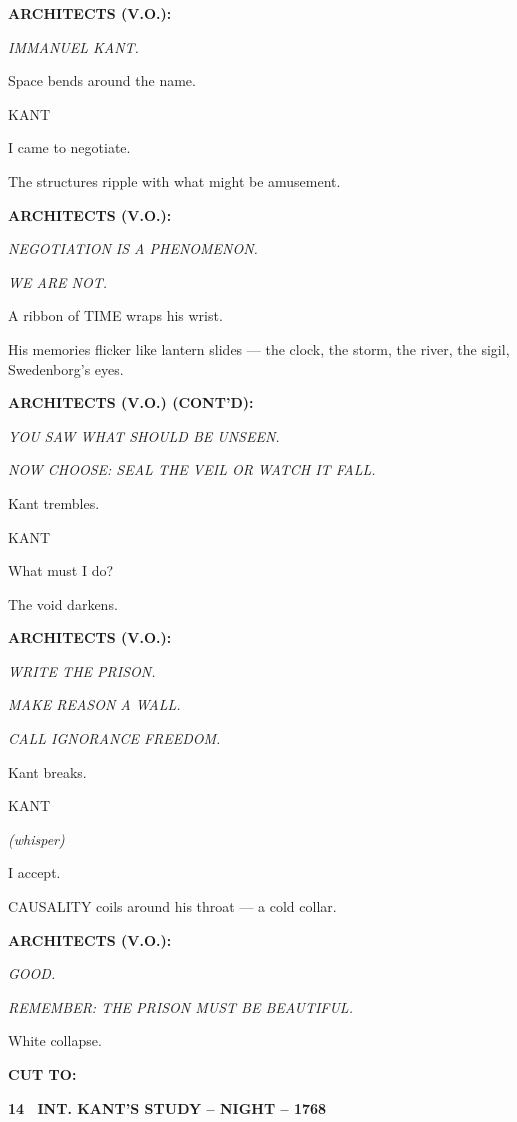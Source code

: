 \documentclass[12pt]{article}
\newcommand{\scene}[2]{%
  \vspace{1.8\baselineskip}%
  \noindent\textbf{#1 \ #2}\par\vspace{0.4\baselineskip}%
}
\newenvironment{dialogue}[1]{%
  \vspace{0.8\baselineskip}%
  \noindent\hspace*{2.3in}\textsc{#1}\par%
  \noindent\hspace*{1.5in}\begin{minipage}[t]{4.5in}%
}{%
  \end{minipage}\par%
}
\newcommand{\paren}[1]{%
  \noindent\hspace*{1.8in}\textit{(#1)}\par%
}
\newcommand{\transition}[1]{%
  \vspace{0.6\baselineskip}%
  \begin{flushright}\textbf{#1}\end{flushright}%
}
\begin{document}
\textbf{ARCHITECTS (V.O.):}

\emph{IMMANUEL KANT.}

Space bends around the name.

\begin{dialogue}{KANT}
I came to negotiate.
\end{dialogue}

The structures ripple with what might be amusement.

\textbf{ARCHITECTS (V.O.):}

\emph{NEGOTIATION IS A PHENOMENON.}

\emph{WE ARE NOT.}

A ribbon of TIME wraps his wrist.

His memories flicker like lantern slides --- the clock, the storm, the
river, the sigil, Swedenborg's eyes.

\textbf{ARCHITECTS (V.O.) (CONT'D):}

\emph{YOU SAW WHAT SHOULD BE UNSEEN.}

\emph{NOW CHOOSE: SEAL THE VEIL OR WATCH IT FALL.}

Kant trembles.

\begin{dialogue}{KANT}
What must I do?
\end{dialogue}

The void darkens.

\textbf{ARCHITECTS (V.O.):}

\emph{WRITE THE PRISON.}

\emph{MAKE REASON A WALL.}

\emph{CALL IGNORANCE FREEDOM.}

Kant breaks.

\begin{dialogue}{KANT}
\paren{whisper}
I accept.
\end{dialogue}

CAUSALITY coils around his throat --- a cold collar.

\textbf{ARCHITECTS (V.O.):}

\emph{GOOD.}

\emph{REMEMBER: THE PRISON MUST BE BEAUTIFUL.}

White collapse.

\transition{CUT TO:}


\scene{14}{INT. KANT'S STUDY -- NIGHT -- 1768}
\end{document}
